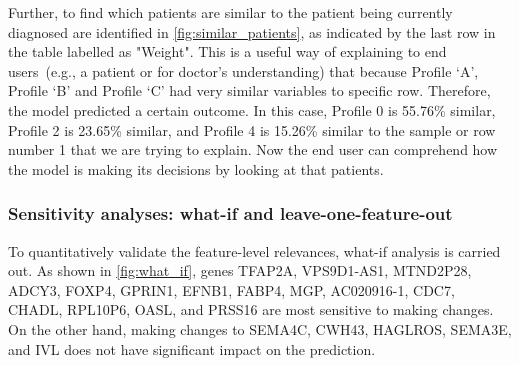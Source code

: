 
\hspace*{3.5mm} Further, to find which patients are similar to the patient being currently diagnosed are identified in \cref{fig:similar_patients}, as indicated by the last row in the table labelled as "Weight". This is a useful way of explaining to end users~(e.g., a patient or for doctor's understanding) that because Profile `A', Profile `B' and Profile `C' had very similar variables to specific row. Therefore, the model predicted a certain outcome. In this case, Profile 0 is 55.76\% similar, Profile 2 is 23.65\% similar, and Profile 4 is 15.26\% similar to the sample or row number 1 that we are trying to explain. Now the end user can comprehend how the model is making its decisions by looking at that patients.  

\subsubsection{Sensitivity analyses: what-if and leave-one-feature-out}
To quantitatively validate the feature-level relevances, what-if analysis is carried out. As shown in \cref{fig:what_if}, genes TFAP2A, VPS9D1-AS1, MTND2P28, ADCY3, FOXP4, GPRIN1, EFNB1, FABP4, MGP, AC020916-1, CDC7, CHADL, RPL10P6, OASL, and PRSS16 are most sensitive to making changes. On the other hand, making changes to SEMA4C, CWH43, HAGLROS, SEMA3E, and IVL does not have significant impact on the prediction. 

